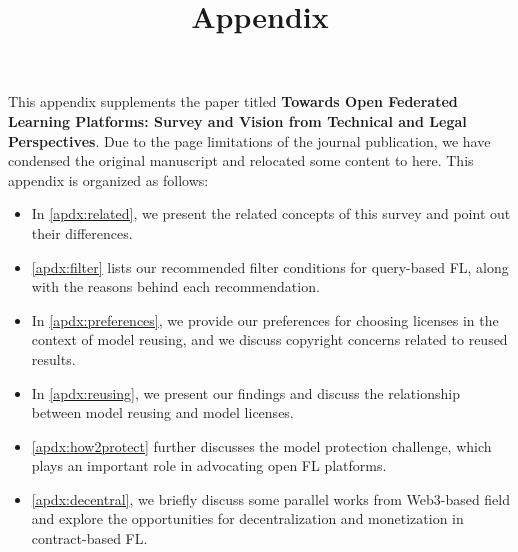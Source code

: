 \documentclass[journal]{IEEEtran}
\begin{document}
\title{Appendix}

\maketitle
This appendix supplements the paper titled \textbf{Towards Open Federated Learning Platforms: Survey and Vision from Technical and Legal Perspectives}. Due to the page limitations of the journal publication, we have condensed the original manuscript and relocated some content to here.
This appendix is organized as follows: 
\begin{itemize}
    \item In \ddag\ref{apdx:related}, we present the related concepts of this survey and point out their differences.
    
    \item \ddag\ref{apdx:filter} lists our recommended filter conditions for query-based FL, along with the reasons behind each recommendation.
    
    \item In \ddag\ref{apdx:preferences}, we provide our preferences for choosing licenses in the context of model reusing, and we discuss copyright concerns related to reused results.
    
    \item In \ddag\ref{apdx:reusing}, we present our findings and discuss the relationship between model reusing and model licenses.
    
    \item \ddag\ref{apdx:how2protect} further discusses the model protection challenge, which plays an important role in advocating open FL platforms.
    
    \item \ddag\ref{apdx:decentral}, we briefly discuss some parallel works from Web3-based field and explore the opportunities for decentralization and monetization in contract-based FL.
\end{itemize}
\end{document}
